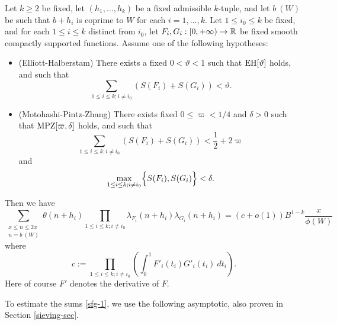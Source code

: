 \begin{theorem}\label{prime-asym}  Let $k \geq 2$ be fixed, let $(h_1,\dots,h_k)$ be a fixed admissible $k$-tuple, and let $b\ (W)$ be such that $b+h_i$ is coprime to $W$ for each $i=1,\dots,k$.  Let $1 \leq i_0 \leq k$ be fixed, and for each $1 \leq i \leq k$ distinct from $i_0$, let $F_{i}, G_{i}: [0,+\infty) \to \mathbb{R}$ be fixed smooth compactly supported functions.  Assume one of the following hypotheses:
\begin{itemize}
\item[(i)]  (Elliott-Halberstam) There exists a fixed $0 < \vartheta < 1$ such that $\operatorname*{EH}[\vartheta]$ holds, and such that
\begin{equation}\label{fg-upper}
\sum_{1 \leq i \leq k; i \neq i_0} ( S(F_{i}) + S(G_{i}) ) < \vartheta.
\end{equation}
\item[(ii)]  (Motohashi-Pintz-Zhang) There exists fixed $0 \leq \varpi < 1/4$ and $\delta > 0$ such that $\operatorname*{MPZ}[\varpi,\delta]$ holds, and such that
\begin{equation}\label{fg-upper-alt}
\sum_{1 \leq i \leq k; i \neq i_0} ( S(F_{i}) + S(G_{i}) ) < \frac{1}{2} + 2 \varpi
\end{equation}
and
\begin{equation}
\max_{1 \leq i \leq k; i \neq i_0} \Bigl\{S(F_{i}), S(G_{i}) \Bigr\}< \delta.
\end{equation}
\end{itemize}
Then we have
\begin{equation}\label{theta-oo}
 \sum_{\substack{x \leq n \leq 2x\\ n = b\ (W)}} \theta(n+h_i) \prod_{1 \leq i \leq k; i \neq i_0} \lambda_{F_{i}}(n+h_{i}) \lambda_{G_{i}}(n+h_{i}) =
(c+o(1)) B^{1-k} \frac{x}{\phi(W)}
\end{equation}
where
$$ c := \prod_{1 \leq i \leq k; i \neq i_0} \left(\int_0^1 F'_i(t_{i}) G'_{i}(t_{i})\ dt_{i}\right).$$
Here of course $F'$ denotes the derivative of $F$.
\end{theorem}

To estimate the sums \eqref{sfg-1}, we use the following asymptotic, also proven in Section \ref{sieving-sec}.

